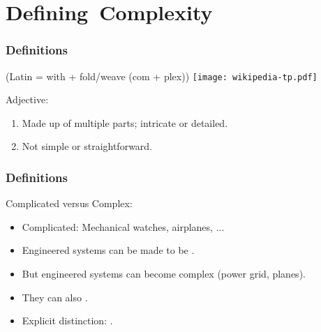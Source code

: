 

\section{Defining\ Complexity}

\begin{frame}
  \frametitle{Definitions}

   (Latin = with + fold/weave (com + plex))
  \hfill
  \texttt{[image: wikipedia-tp.pdf]}

  \medskip

  \begin{block}{Adjective:}
    \begin{enumerate}
    \item Made up of multiple parts; intricate or detailed.
    \item Not simple or straightforward.
    \end{enumerate}
  \end{block}

\end{frame}


\begin{frame}
  \frametitle{Definitions}

  \begin{block}{Complicated versus Complex:}
    \begin{itemize}
    \item<+-> 
      Complicated: Mechanical watches, airplanes, ...
    \item<+-> 
      Engineered systems can be made to be .
    \item<+->
      But engineered systems can become complex (power grid, planes).
    \item<+-> 
      They can also .
    \item<+-> 
      Explicit distinction: .
    \end{itemize}
  \end{block}


\end{frame}


